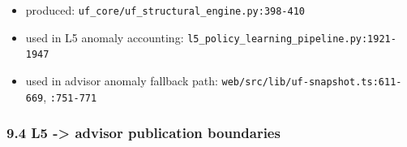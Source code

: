 \documentclass[
]{article}
\providecommand{\tightlist}{%
  \setlength{\itemsep}{0pt}\setlength{\parskip}{0pt}}
\begin{document}
\begin{itemize}
  \begin{itemize}
  \tightlist
  \item
    produced: \texttt{uf\_core/uf\_structural\_engine.py:398-410}
  \item
    used in L5 anomaly accounting:
    \texttt{l5\_policy\_learning\_pipeline.py:1921-1947}
  \item
    used in advisor anomaly fallback path:
    \texttt{web/src/lib/uf-snapshot.ts:611-669}, \texttt{:751-771}
  \end{itemize}
\end{itemize}

\subsubsection{9.4 L5 -\textgreater{} advisor publication
boundaries}\label{94-l5---advisor-publication-boundaries}
\end{document}
